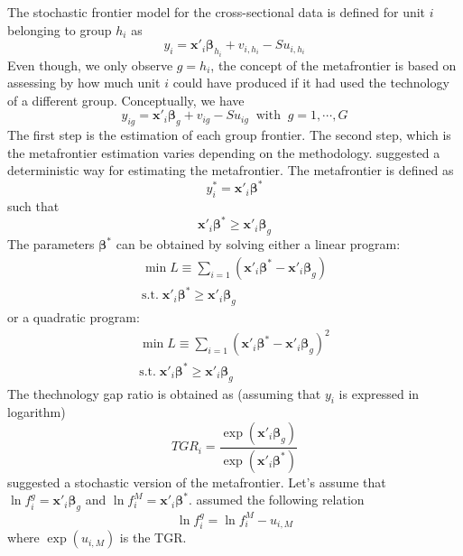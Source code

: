 \documentclass[nojss]{jss}
\begin{document}
The stochastic frontier model for the cross-sectional data is defined for 
 unit $i$ belonging to group $h_i$ as
 \begin{equation}\label{eq:3.2.1}
 y_{i} = \mathbf{x}'_i\bm{\beta}_{h_i} + v_{i,{h_i}} - Su_{i,{h_i}}
 \end{equation}
 Even though, we only observe $g = h_i$, the concept of the metafrontier is 
 based on assessing by how much unit $i$ could have produced if it had used the 
 technology of a different group. Conceptually, we have 
 \begin{equation}\label{eq:3.2.2}
 y_{ig} = \mathbf{x}'_i\bm{\beta}_g + v_{ig} - Su_{ig} \;\; \text{with} 
 \;\; g = 1, \cdots, G
 \end{equation}
  The first step is the estimation of each group frontier. The second step, 
 which is the metafrontier estimation varies depending on the methodology.
 \citet{batt04} suggested a deterministic way for estimating the 
 metafrontier. The metafrontier is defined as
\begin{equation}\label{eq:3.2.3}
 y_i^* =\mathbf{x}'_i\bm{\beta}^*
 \end{equation}
 such that 
 $$\mathbf{x}'_i\bm{\beta}^* \geq \mathbf{x}'_i\bm{\beta}_g$$
 The parameters $\bm{\beta}^*$ can be obtained by solving either a linear 
 program:
 $$\begin{matrix} 
 \min L \equiv \sum_{i = 1} \left(\mathbf{x}'_i\bm{\beta}^* - 
 \mathbf{x}'_i\bm{\beta}_g\right) \\[1em]
 \text{s.t.} \; \mathbf{x}'_i\bm{\beta}^* \geq \mathbf{x}'_i\bm{\beta}_g
  \end{matrix}$$
 or a quadratic program:
$$\begin{matrix} 
 \min L \equiv \sum_{i = 1} \left(\mathbf{x}'_i\bm{\beta}^* - 
 \mathbf{x}'_i\bm{\beta}_g\right)^2 \\[1em]
 \text{s.t.} \; \mathbf{x}'_i\bm{\beta}^* \geq \mathbf{x}'_i\bm{\beta}_g
  \end{matrix}$$
The thechnology gap ratio is obtained as (assuming that $y_i$ is expressed in logarithm)
%
 \begin{equation}\label{eq:3.2.4}
 TGR_i = \frac{\exp{\left(\mathbf{x}'_i\bm{\beta}_g\right)}}{
 \exp{\left(\mathbf{x}'_i\bm{\beta}^*\right)}}
 \end{equation}
 \citet{huang14} suggested a stochastic version of the metafrontier. Let's
 assume that $\ln f_i^g=\mathbf{x}'_i\bm{\beta}_g$ and 
 $\ln f_i^M = \mathbf{x}'_i\bm{\beta}^*$. \citet{huang14} assumed the 
 following relation
 \begin{equation}\label{eq:3.2.5}
 \ln f_i^g = \ln f_i^M - u_{i,M}
 \end{equation}
 where $\exp{\left(u_{i,M}\right)}$ is the TGR.
 
\end{document}
